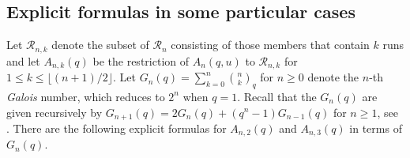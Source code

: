 \documentclass[11pt,a4paper]{article}
\begin{document}
\subsection{Explicit formulas in some particular cases}

Let $\mathcal{R}_{n,k}$ denote the subset of $\mathcal{R}_n$ consisting of those members that contain $k$ runs and let $A_{n,k}(q)$ be the restriction of $A_n(q,u)$ to $\mathcal{R}_{n,k}$ for $1 \leq k \leq \lfloor(n+1)/2 \rfloor$. Let $G_n(q)=\sum_{k=0}^n\binom{n}{k}_q$ for $n \geq 0$ denote the $n$-th \emph{Galois} number, which reduces to $2^n$ when $q=1$.  Recall that the $G_n(q)$ are given recursively by $G_{n+1}(q)=2G_{n}(q)+(q^n-1)G_{n-1}(q)$ for $n\geq 1$, see \cite{GR}.  There are the following explicit formulas for $A_{n,2}(q)$ and $A_{n,3}(q)$ in terms of $G_n(q)$.
\end{document}
